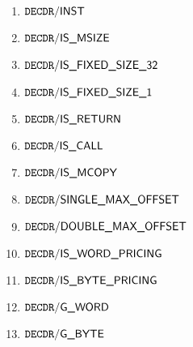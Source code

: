 \begin{enumerate}
	\item $\mxpDecoderInst$
	\item $\mxpDecoderIsMsize$
	\item $\mxpDecoderIsFixedSizeThirtyTwo$
	\item $\mxpDecoderIsFixedSizeOne$
	\item $\mxpDecoderIsReturn$
	\item $\mxpDecoderIsCall$
	\item $\mxpDecoderIsMcopy$
	\item $\mxpDecoderSingleMaxOffset$
	\item $\mxpDecoderDoubleMaxOffset$
	\item $\mxpDecoderIsWordPricing$
	\item $\mxpDecoderIsBytePricing$
	\item $\mxpDecoderGWord$
	\item $\mxpDecoderGByte$
\end{enumerate}
